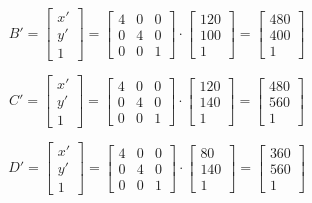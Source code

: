 \documentclass{article}
\begin{document}
$$B' = \begin{bmatrix}
	x'\\
	y'\\
	1
\end{bmatrix} = \begin{bmatrix}
	4 & 0 & 0\\
	0 & 4 & 0\\
	0 & 0 & 1
\end{bmatrix} \cdot \begin{bmatrix}
	120\\
	100\\
	1
\end{bmatrix} = \begin{bmatrix}
	480\\
	400\\
	1
\end{bmatrix}$$

$$C' = \begin{bmatrix}
	x'\\
	y'\\
	1
\end{bmatrix} = \begin{bmatrix}
	4 & 0 & 0\\
	0 & 4 & 0\\
	0 & 0 & 1
\end{bmatrix} \cdot \begin{bmatrix}
	120\\
	140\\
	1
\end{bmatrix} = \begin{bmatrix}
	480\\
	560\\
	1
\end{bmatrix}$$

$$D' = \begin{bmatrix}
	x'\\
	y'\\
	1
\end{bmatrix} = \begin{bmatrix}
	4 & 0 & 0\\
	0 & 4 & 0\\
	0 & 0 & 1
\end{bmatrix} \cdot \begin{bmatrix}
	80\\
	140\\
	1
\end{bmatrix} = \begin{bmatrix}
	360\\
	560\\
	1
\end{bmatrix}$$
\end{document}
